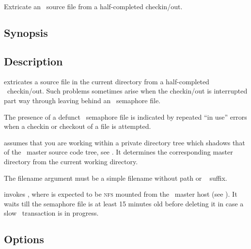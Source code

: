 
\newpage
\section{}
\label{ae}

Extricate an \aipspp\ source file from a half-completed checkin/out.

\subsection*{Synopsis}

\begin{synopsis}
\end{synopsis}

\subsection*{Description}

 extricates a source file in the current directory from a
half-completed \rcs\ checkin/out.  Such problems sometimes arise when the
checkin/out is interrupted part way through leaving behind an \rcs\ semaphore
file.

The presence of a defunct \rcs\ semaphore file is indicated by repeated
``in use'' errors when a checkin or checkout of a file is attempted.

 assumes that you are working within a private directory tree which
shadows that of the \aipspp\ master source code tree, see .
It determines the corresponding master directory from the current working
directory.

The filename argument must be a simple filename without path or \rcs\ 
 suffix.

 invokes , where  is
expected to be \textsc{nfs} mounted from the \aipspp\ master host (see
\sref{RCS directories}).  It waits till the semaphore file is at least 15
minutes old before deleting it in case a slow \rcs\ transaction is in
progress.

\subsection*{Options}


